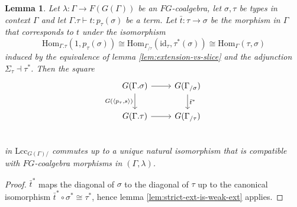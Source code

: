 \documentclass[a4paper]{article}
\newtheorem{lemma}[theorem]{Lemma}
\theoremstyle{remark}
\theoremstyle{definition}
\begin{document}
\begin{lemma}
  \label{lem:substitution-vs-pullback}
  Let $\lambda : \Gamma \rightarrow F(G(\Gamma))$ be an $FG$-coalgebra, let $\sigma, \tau$ be types in context $\Gamma$ and let $\Gamma.\tau \vdash t : p_\tau(\sigma)$ be a term.
  Let $\bar t : \tau \rightarrow \sigma$ be the morphism in $\Gamma$ that corresponds to $t$ under the isomorphism
  \begin{equation}
    \mathrm{Hom}_{\Gamma.\tau}(1, p_\tau(\sigma)) \cong \mathrm{Hom}_{\Gamma_{/ \tau}}(\mathrm{id}_\tau, \tau^*(\sigma)) \cong \mathrm{Hom}_\Gamma(\tau, \sigma)
  \end{equation}
  induced by the equivalence of lemma \ref{lem:extension-vs-slice} and the adjunction $\Sigma_\tau \dashv \tau^*$.
  Then the square
  \begin{equation}
    \begin{tikzcd}
      G(\Gamma.\sigma) \arrow[r] \arrow[d, "{G(\langle p_\tau, s \rangle)}"'] & G(\Gamma_{/ \sigma}) \arrow[d, "\bar t^*"] \\
      G(\Gamma.\tau) \arrow[r] & G(\Gamma_{/ \tau}) \\
    \end{tikzcd}
  \end{equation}
  in $\mathrm{Lcc}_{G(\Gamma)/ }$ commutes up to a unique natural isomorphism that is compatible with $FG$-coalgebra morphisms in $(\Gamma, \lambda)$.
\end{lemma}
\begin{proof}
  $\bar t^*$ maps the diagonal of $\sigma$ to the diagonal of $\tau$ up to the canonical isomorphism $\bar t^* \circ \sigma^* \cong \tau^*$, hence lemma \ref{lem:strict-ext-is-weak-ext} applies.
\end{proof}
\end{document}
